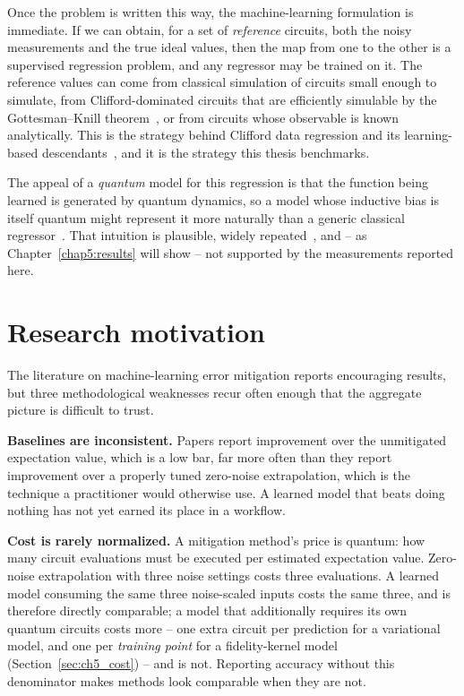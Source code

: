 \documentclass[Thesis.tex]{subfiles}
\begin{document}
Once the problem is written this way, the machine-learning formulation is immediate.
If we can obtain, for a set of \emph{reference} circuits, both the noisy measurements
and the true ideal values, then the map from one to the other is a supervised
regression problem, and any regressor may be trained on it. The reference values can
come from classical simulation of circuits small enough to simulate, from
Clifford-dominated circuits that are efficiently simulable by the Gottesman--Knill
theorem~\cite{nielsen2012book}, or from circuits whose observable is known
analytically. This is the strategy behind Clifford data regression and its
learning-based descendants~\cite{czarnik2021clifford,strikis2021learning,lowe2021unified,liao2024machine}, and it
is the strategy this thesis benchmarks.

The appeal of a \emph{quantum} model for this regression is that the function being
learned is generated by quantum dynamics, so a model whose inductive bias is itself
quantum might represent it more naturally than a generic classical
regressor~\cite{havlicek2019supervised,schuld2021kernel,huang2021power}. That
intuition is plausible, widely repeated~\cite{schuld2022isquantum,bowles2024better}, and -- as Chapter~\ref{chap5:results} will
show -- not supported by the measurements reported here.

\section{Research motivation}

The literature on machine-learning error mitigation reports encouraging results, but
three methodological weaknesses recur often enough that the aggregate picture is
difficult to trust.

\textbf{Baselines are inconsistent.} Papers report improvement over the unmitigated
expectation value, which is a low bar, far more often than they report improvement
over a properly tuned zero-noise extrapolation, which is the technique a
practitioner would otherwise use. A learned model that beats doing nothing has not
yet earned its place in a workflow.

\textbf{Cost is rarely normalized.} A mitigation method's price is quantum: how many
circuit evaluations must be executed per estimated expectation value. Zero-noise
extrapolation with three noise settings costs three evaluations. A learned model
consuming the same three noise-scaled inputs costs the same three, and is therefore
directly comparable; a model that additionally requires its own quantum circuits
costs more -- one extra circuit per prediction for a variational model, and one per
\emph{training point} for a fidelity-kernel model (Section~\ref{sec:ch5_cost}) -- and
is not. Reporting accuracy without this denominator makes
methods look comparable when they are not.
\end{document}
